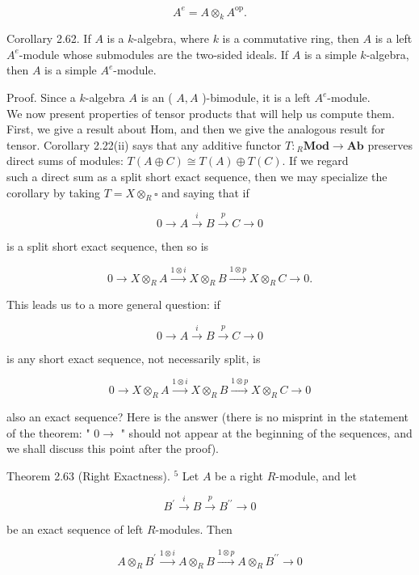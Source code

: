 \documentclass[10pt]{article}
\begin{document}
$$
A^{e}=A \otimes_{k} A^{\mathrm{op}} .
$$

Corollary 2.62. If $A$ is a $k$-algebra, where $k$ is a commutative ring, then $A$ is a left $A^{e}$-module whose submodules are the two-sided ideals. If $A$ is a simple $k$-algebra, then $A$ is a simple $A^{e}$-module.

Proof. Since a $k$-algebra $A$ is an ( $A, A$ )-bimodule, it is a left $A^{e}$-module.\\
We now present properties of tensor products that will help us compute them. First, we give a result about Hom, and then we give the analogous result for tensor. Corollary 2.22(ii) says that any additive functor $T:{ }_{R} \mathbf{M o d} \rightarrow \mathbf{A b}$ preserves direct sums of modules: $T(A \oplus C) \cong T(A) \oplus T(C)$. If we regard\\
such a direct sum as a split short exact sequence, then we may specialize the corollary by taking $T=X \otimes_{R} \square$ and saying that if

$$
0 \rightarrow A \xrightarrow{i} B \xrightarrow{p} C \rightarrow 0
$$

is a split short exact sequence, then so is

$$
0 \rightarrow X \otimes_{R} A \xrightarrow{1 \otimes i} X \otimes_{R} B \xrightarrow{1 \otimes p} X \otimes_{R} C \rightarrow 0 .
$$

This leads us to a more general question: if

$$
0 \rightarrow A \xrightarrow{i} B \xrightarrow{p} C \rightarrow 0
$$

is any short exact sequence, not necessarily split, is

$$
0 \rightarrow X \otimes_{R} A \xrightarrow{1 \otimes i} X \otimes_{R} B \xrightarrow{1 \otimes p} X \otimes_{R} C \rightarrow 0
$$

also an exact sequence? Here is the answer (there is no misprint in the statement of the theorem: " $0 \rightarrow$ " should not appear at the beginning of the sequences, and we shall discuss this point after the proof).

Theorem 2.63 (Right Exactness). ${ }^{5}$ Let $A$ be a right $R$-module, and let

$$
B^{\prime} \xrightarrow{i} B \xrightarrow{p} B^{\prime \prime} \rightarrow 0
$$

be an exact sequence of left $R$-modules. Then

$$
A \otimes_{R} B^{\prime} \xrightarrow{1 \otimes i} A \otimes_{R} B \xrightarrow{1 \otimes p} A \otimes_{R} B^{\prime \prime} \rightarrow 0
$$
\end{document}
